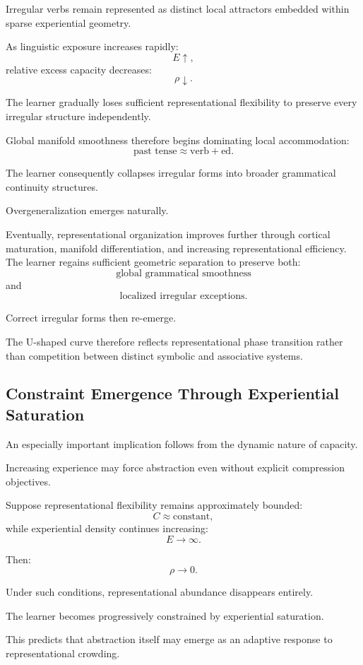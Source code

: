 \documentclass[12pt,a4paper]{article}
\begin{document}
Irregular verbs remain represented as distinct local attractors embedded within sparse experiential geometry.

As linguistic exposure increases rapidly:
\[
E
\uparrow,
\]
relative excess capacity decreases:
\[
\rho
\downarrow.
\]

The learner gradually loses sufficient representational flexibility to preserve every irregular structure independently.

Global manifold smoothness therefore begins dominating local accommodation:
\[
\text{past tense}
\approx
\text{verb} + \text{ed}.
\]

The learner consequently collapses irregular forms into broader grammatical continuity structures.

Overgeneralization emerges naturally.

Eventually, representational organization improves further through cortical maturation, manifold differentiation, and increasing representational efficiency. The learner regains sufficient geometric separation to preserve both:
\[
\text{global grammatical smoothness}
\]
and
\[
\text{localized irregular exceptions}.
\]

Correct irregular forms then re-emerge.

The U-shaped curve therefore reflects representational phase transition rather than competition between distinct symbolic and associative systems.

\subsection{Constraint Emergence Through Experiential Saturation}

An especially important implication follows from the dynamic nature of capacity.

Increasing experience may force abstraction even without explicit compression objectives.

Suppose representational flexibility remains approximately bounded:
\[
C
\approx
\text{constant},
\]
while experiential density continues increasing:
\[
E
\rightarrow
\infty.
\]

Then:
\[
\rho
\rightarrow
0.
\]

Under such conditions, representational abundance disappears entirely.

The learner becomes progressively constrained by experiential saturation.

This predicts that abstraction itself may emerge as an adaptive response to representational crowding.
\end{document}
